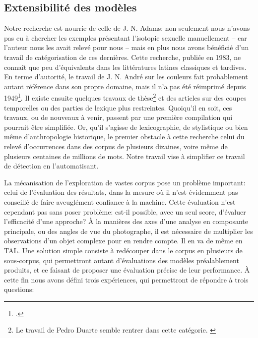 \subsection{Extensibilité des modèles}

Notre recherche est nourrie de celle de J. N. Adams: non seulement nous n'avons pas eu à chercher les exemples présentant l'isotopie sexuelle manuellement -- car l'auteur nous les avait relevé pour nous -- mais en plus nous avons bénéficié d'un travail de catégorisation de ces dernières. Cette recherche, publiée en 1983, ne connaît que peu d'équivalents dans les littératures latines classiques et tardives. En terme d'autorité, le travail de J. N. André sur les couleurs fait probablement autant référence dans son propre domaine, mais il n'a pas été réimprimé depuis 1949\footcite{andre1949etude}. Il existe ensuite quelques travaux de thèse\footnote{Le travail de Pedro Duarte semble rentrer dans cette catégorie. \textcite{duarte_vocabulaire_2010}} et des articles sur des coupes temporelles ou des parties de lexique plus restreintes. Quoiqu'il en soit, ces travaux, ou de nouveaux à venir, passent par une première compilation qui pourrait être simplifiée. Or, qu'il s'agisse de lexicographie, de stylistique ou bien même d'anthropologie historique, le premier obstacle à cette recherche celui du relevé d'occurrences dans des corpus de plusieurs dizaines, voire même de plusieurs centaines de millions de mots. Notre travail vise à simplifier ce travail de détection en l'automatisant.

La mécanisation de l'exploration de vastes corpus pose un problème important: celui de l'évaluation des résultats, dans la mesure où il n'est évidemment pas conseillé de faire aveuglément confiance à la machine. Cette évaluation n'est cependant pas sans poser problème: est-il possible, avec un seul score, d'évaluer l'efficacité d'une approche? À la manières des axes d'une analyse en composante principale, ou des angles de vue du photographe, il est nécessaire de multiplier les observations d'un objet complexe pour en rendre compte. Il en va de même en TAL. Une solution simple consiste à redécouper dans le corpus en plusieurs de sous-corpus, qui permettront autant d'évaluations des modèles préalablement produits, et ce faisant de proposer une évaluation précise de leur performance. À cette fin nous avons défini trois expériences, qui permettront de répondre à trois questions:

